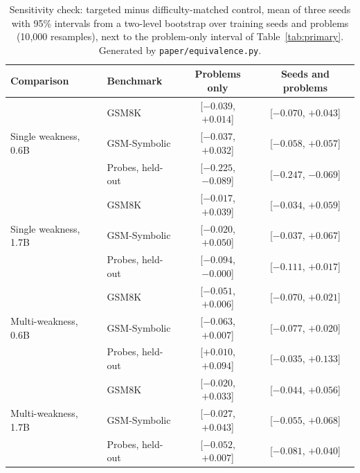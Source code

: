 \documentclass[11pt]{article}
\begin{document}
\begin{table}[t]
\centering
\caption{Sensitivity check: targeted minus difficulty-matched control, mean of three seeds with 95\% intervals from a
two-level bootstrap over training seeds and problems (10{,}000 resamples), next to the problem-only interval of
Table~\ref{tab:primary}. Generated by \texttt{paper/equivalence.py}.}
\label{tab:seeds}
\small
\begin{tabular}{llcc}
\toprule
Comparison & Benchmark & Problems only & Seeds and problems \\
\midrule
\multirow{3}{*}{Single weakness, 0.6B} & GSM8K & [$-0.039$, $+0.014$] & [$-0.070$, $+0.043$] \\
& GSM-Symbolic & [$-0.037$, $+0.032$] & [$-0.058$, $+0.057$] \\
& Probes, held-out & [$-0.225$, $-0.089$] & [$-0.247$, $-0.069$] \\
\midrule
\multirow{3}{*}{Single weakness, 1.7B} & GSM8K & [$-0.017$, $+0.039$] & [$-0.034$, $+0.059$] \\
& GSM-Symbolic & [$-0.020$, $+0.050$] & [$-0.037$, $+0.067$] \\
& Probes, held-out & [$-0.094$, $-0.000$] & [$-0.111$, $+0.017$] \\
\midrule
\multirow{3}{*}{Multi-weakness, 0.6B} & GSM8K & [$-0.051$, $+0.006$] & [$-0.070$, $+0.021$] \\
& GSM-Symbolic & [$-0.063$, $+0.007$] & [$-0.077$, $+0.020$] \\
& Probes, held-out & [$+0.010$, $+0.094$] & [$-0.035$, $+0.133$] \\
\midrule
\multirow{3}{*}{Multi-weakness, 1.7B} & GSM8K & [$-0.020$, $+0.033$] & [$-0.044$, $+0.056$] \\
& GSM-Symbolic & [$-0.027$, $+0.043$] & [$-0.055$, $+0.068$] \\
& Probes, held-out & [$-0.052$, $+0.007$] & [$-0.081$, $+0.040$] \\
\bottomrule
\end{tabular}
\end{table}
\end{document}
